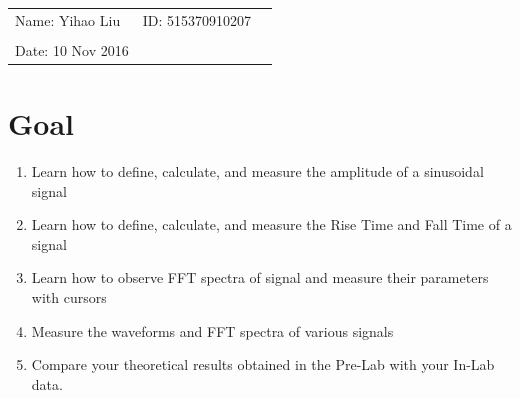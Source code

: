 \documentclass{article}
\begin{document}
\vspace*{0.25cm}

\hrulefill

\thispagestyle{empty}

\begin{center}
\begin{large}
\end{large}

\hrulefill

\vspace*{5cm}
\begin{Large}
\end{Large}

\vspace{2em}

\begin{large}
\end{large}
\end{center}


\vfill

\begin{table}[h!]
\flushleft
\begin{tabular}{lll}
Name: Yihao Liu \hspace*{2em}&
ID: 515370910207\hspace*{2em}\\


\\

Date: 10 Nov 2016 

\end{tabular}
\end{table}

\hfill
\begin{tiny}
[rev. 1.0]
\end{tiny}
\newpage


\section{Goal}
\begin{enumerate}
\item
Learn how to define, calculate, and measure the amplitude of a sinusoidal
signal
\item
Learn how to define, calculate, and measure the Rise Time and Fall Time of a
signal
\item
Learn how to observe FFT spectra of signal and measure their parameters with
cursors
\item
Measure the waveforms and FFT spectra of various signals
\item
Compare your theoretical results obtained in the Pre-Lab with your In-Lab
data.
\end{enumerate}
\end{document}
